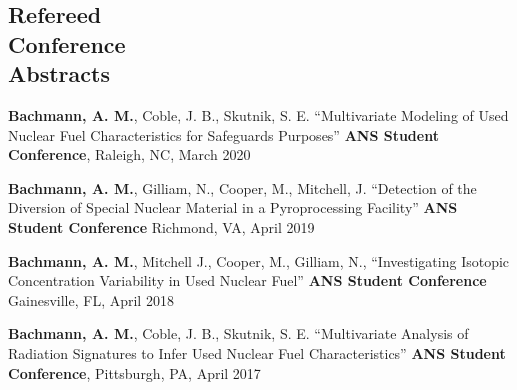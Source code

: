\documentclass[margin,line]{resume}
\begin{document}
\begin{resume}
    \section{\mysidestyle Refereed\\Conference\\Abstracts}
    \begin{bibenum}
    \item {}
    \item \textbf{Bachmann, A. M.}, Coble, J. B., Skutnik, S. E. 
          ``Multivariate Modeling of Used Nuclear Fuel Characteristics for 
          Safeguards Purposes'' \textbf{ANS Student Conference}, Raleigh,
          NC, March 2020
    \item \textbf{Bachmann, A. M.}, Gilliam, N., Cooper, M., Mitchell, J. 
          ``Detection of the Diversion of Special Nuclear Material in a 
          Pyroprocessing Facility'' \textbf{ANS Student Conference} 
          Richmond, VA, April 2019
    \item {}

    \item \textbf{Bachmann, A. M.}, Mitchell J., Cooper, M., Gilliam, N., 
           ``Investigating Isotopic Concentration Variability in Used 
           Nuclear Fuel'' \textbf{ANS Student Conference} Gainesville, FL, 
           April 2018
    \item \textbf{Bachmann, A. M.}, Coble, J. B., Skutnik, S. E. 
           ``Multivariate Analysis of Radiation Signatures to Infer Used 
           Nuclear Fuel Characteristics'' \textbf{ANS Student Conference}, 
           Pittsburgh, PA, April 2017
    \end{bibenum}


\end{resume}
\end{document}
